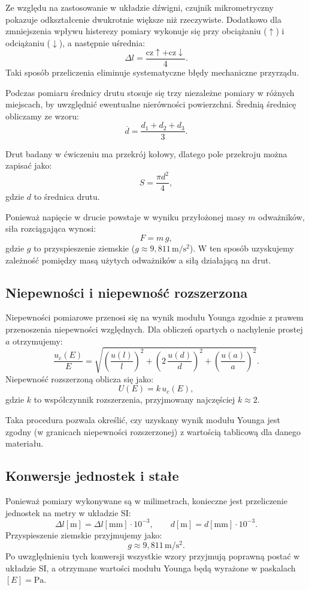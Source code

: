 \documentclass{fizykalab}
\begin{document}
Ze względu na zastosowanie w układzie dźwigni, czujnik mikrometryczny
pokazuje odkształcenie dwukrotnie większe niż rzeczywiste. Dodatkowo dla
zmniejszenia wpływu histerezy pomiary wykonuje się przy obciążaniu
(\(\uparrow\)) i odciążaniu (\(\downarrow\)), a następnie uśrednia:
$$
\Delta l = \frac{\text{cz} \uparrow + \text{cz} \downarrow}{4}.
$$
Taki sposób przeliczenia eliminuje systematyczne błędy
mechaniczne przyrządu.

\bigbreak
Podczas pomiaru średnicy drutu stosuje się trzy niezależne pomiary w
różnych miejscach, by uwzględnić ewentualne nierówności powierzchni.
Średnią średnicę obliczamy ze wzoru:
$$
\overline{d} = \frac{d_{1}+d_{2}+d_{3}}{3}.
$$

Drut badany w ćwiczeniu ma przekrój kołowy, dlatego pole przekroju można
zapisać jako:
$$
S = \frac{\pi d^{2}}{4},
$$
gdzie \( d \) to średnica drutu.

Ponieważ napięcie w drucie powstaje w wyniku przyłożonej masy \( m \)
odważników, siła rozciągająca wynosi:
$$
F = m\,g,
$$
gdzie \( g \) to przyspieszenie ziemskie (\( g \approx 9{,}811\,\mathrm{m/s^2} \)).
W ten sposób uzyskujemy zależność pomiędzy masą użytych odważników a
siłą działającą na drut.

\subsection{Niepewności i niepewność rozszerzona}

Niepewności pomiarowe przenosi się na wynik modułu Younga zgodnie
z prawem przenoszenia niepewności względnych. Dla obliczeń opartych
o nachylenie prostej \(a\) otrzymujemy:
$$
\frac{u_{c}(E)}{E} =
\sqrt{
  \left(\frac{u(l)}{l}\right)^{2} +
  \left(2\,\frac{u(d)}{d}\right)^{2} +
  \left(\frac{u(a)}{a}\right)^{2}
}.
$$
Niepewność rozszerzoną oblicza się jako:
$$
U(E) = k\,u_{c}(E),
$$
gdzie \(k\) to współczynnik rozszerzenia, przyjmowany najczęściej
\(k \approx 2\).

Taka procedura pozwala określić, czy uzyskany wynik modułu Younga jest
zgodny (w granicach niepewności rozszerzonej) z wartością tablicową dla
danego materiału.

\subsection{Konwersje jednostek i stałe}

Ponieważ pomiary wykonywane są w milimetrach, konieczne jest
przeliczenie jednostek na metry w układzie SI:
$$
\Delta l[\mathrm{m}] = \Delta l[\mathrm{mm}] \cdot 10^{-3}, \qquad
d[\mathrm{m}] = d[\mathrm{mm}] \cdot 10^{-3}.
$$
Przyspieszenie ziemskie przyjmujemy jako:
$$
g \approx 9{,}811\,\mathrm{m/s^2}.
$$
Po uwzględnieniu tych konwersji wszystkie wzory przyjmują poprawną
postać w układzie SI, a otrzymane wartości modułu Younga będą wyrażone
w paskalach \([E] = \mathrm{Pa}\).
\end{document}

